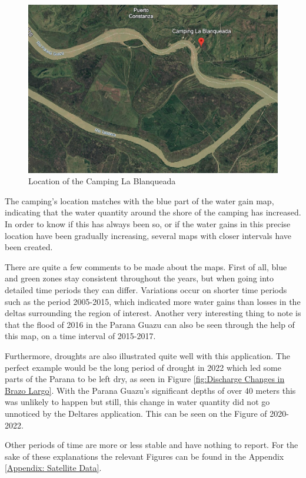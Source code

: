 \begin{figure}[H]
    \centering
    \includegraphics[width=0.5\linewidth]{figures/ch5/Camping Blanqueada.png}
    \caption{Location of the Camping La Blanqueada}
    \label{fig:Camping Blanqueada}
\end{figure}

The camping's location matches with the blue part of the water gain map, indicating that the water quantity around the shore of the camping has increased. 
In order to know if this has always been so, or if the water gains in this precise location have been gradually increasing, several maps with closer intervals have been created. 

There are quite a few comments to be made about the maps. First of all, blue and green zones stay consistent throughout the years, but when going into detailed time periods they can differ. Variations occur on shorter time periods such as the period 2005-2015, which indicated more water gains than losses in the deltas surrounding the region of interest. Another very interesting thing to note is that the flood of 2016 in the Parana Guazu can also be seen through the help of this map, on a time interval of 2015-2017.

Furthermore, droughts are also illustrated quite well with this application. The perfect example would be the long period of drought in 2022 which led some parts of the Parana to be left dry, as seen in Figure \ref{fig:Discharge Changes in Brazo Largo}. With the Parana Guazu's significant depths of over 40 meters this was unlikely to happen but still, this change in water quantity did not go unnoticed by the Deltares application. This can be seen on the Figure of 2020-2022.

Other periods of time are more or less stable and have nothing to report. For the sake of these explanations the relevant Figures can be found in the Appendix \ref{Appendix: Satellite Data}.


